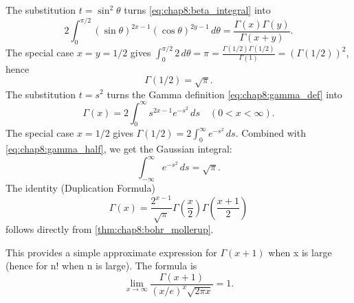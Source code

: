 \begin{remark} %
  \label{rem:chap8:gamma_consequences}
  The substitution $t = \sin^2 \theta$ turns \eqref{eq:chap8:beta_integral} into
  \begin{equation} \label{eq:chap8:beta_trig_form}
    2 \int_0^{\pi/2} (\sin \theta)^{2x-1} (\cos \theta)^{2y-1} \,
    d\theta = \frac{\Gamma(x)\Gamma(y)}{\Gamma(x+y)}.
  \end{equation}
  The special case $x = y = 1/2$ gives $\int_0^{\pi/2} 2 \, d\theta =
  \pi = \frac{\Gamma(1/2)\Gamma(1/2)}{\Gamma(1)} = (\Gamma(1/2))^2$, hence
  \begin{equation} \label{eq:chap8:gamma_half}
    \Gamma(1/2) = \sqrt{\pi}.
  \end{equation}
  The substitution $t=s^2$ turns the Gamma definition
  \eqref{eq:chap8:gamma_def} into
  \begin{equation} \label{eq:chap8:gamma_gauss_form}
    \Gamma(x) = 2 \int_0^\infty s^{2x-1} e^{-s^2} \, ds \quad (0 < x < \infty).
  \end{equation}
  The special case $x=1/2$ gives $\Gamma(1/2) = 2 \int_0^\infty
  e^{-s^2} \, ds$. Combined with \eqref{eq:chap8:gamma_half}, we get
  the Gaussian integral:
  \begin{equation} \label{eq:chap8:gaussian_integral}
    \int_{-\infty}^\infty e^{-s^2} \, ds = \sqrt{\pi}.
  \end{equation}
  The identity (Duplication Formula)
  \begin{equation} \label{eq:chap8:gamma_duplication}
    \Gamma(x) = \frac{2^{x-1}}{\sqrt{\pi}}
    \Gamma\left(\frac{x}{2}\right) \Gamma\left(\frac{x+1}{2}\right)
  \end{equation}
  follows directly from \autoref{thm:chap8:bohr_mollerup}.
\end{remark}

\begin{remark} %
  \label{rem:chap8:stirling}
  This provides a simple approximate expression for $\Gamma(x+1)$
  when x is large (hence for n! when n is large). The formula is
  \begin{equation} \label{eq:chap8:stirling_formula}
    \lim_{x \to \infty} \frac{\Gamma(x+1)}{(x/e)^x \sqrt{2\pi x}} = 1.
  \end{equation}
\end{remark}

